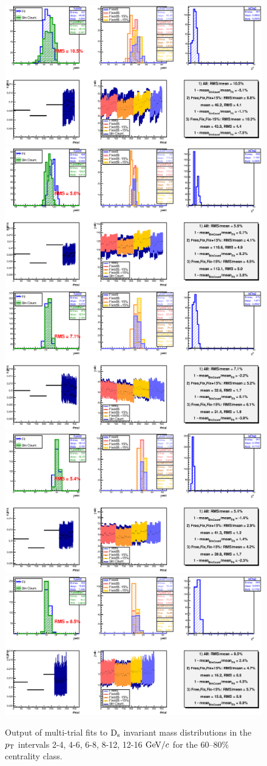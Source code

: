 \begin{figure}[!htb]
 \begin{center}
\includegraphics[angle=0, width=8.cm]{./FigCap5/MT_Pt24_6080.eps}
\includegraphics[angle=0, width=8.cm]{./FigCap5/MT_Pt46_6080.eps}
\includegraphics[angle=0, width=8.cm]{./FigCap5/MT_Pt68_6080.eps}
\includegraphics[angle=0, width=8.cm]{./FigCap5/MT_Pt812_6080.eps}
\includegraphics[angle=0, width=8.cm]{./FigCap5/MT_Pt1216_6080.eps}
\end{center}
 \caption{Output of multi-trial fits to ${\rm D_s}$ invariant mass distributions in the $p_{\rm T}$ intervals 2-4, 4-6, 6-8, 8-12, 12-16 $\mathrm{GeV}/c$  for the 60--80$\%$ centrality class.}
 \label{multitrial_Ds_6080}
\end{figure}





